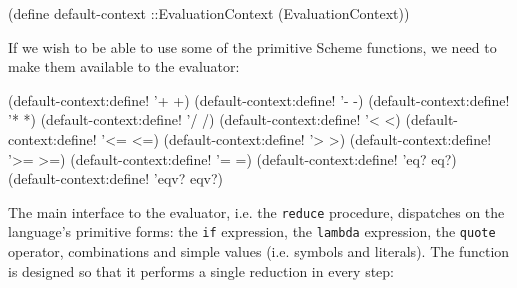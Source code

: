 \documentclass[acmsmall]{acmart}
\newenvironment{Snippet}{\Verbatim[samepage=true]}{\endVerbatim}
\begin{document}
\begin{Snippet}
(define default-context ::EvaluationContext
  (EvaluationContext))
\end{Snippet}

If we wish to be able to use some of the primitive Scheme
functions, we need to make them available to the evaluator:

\begin{Snippet}
(default-context:define! '+ +)
(default-context:define! '- -)
(default-context:define! '* *)
(default-context:define! '/ /)
(default-context:define! '< <)
(default-context:define! '<= <=)
(default-context:define! '> >)
(default-context:define! '>= >=)
(default-context:define! '= =)
(default-context:define! 'eq? eq?)		
(default-context:define! 'eqv? eqv?)
\end{Snippet}

The main interface to the evaluator, i.e. the \texttt{reduce} procedure,
dispatches on the language's primitive forms: the \texttt{if} expression,
the \texttt{lambda} expression, the \texttt{quote} operator, combinations
and simple values (i.e. symbols and literals). The function
is designed so that it performs a single reduction in every step:
\end{document}
